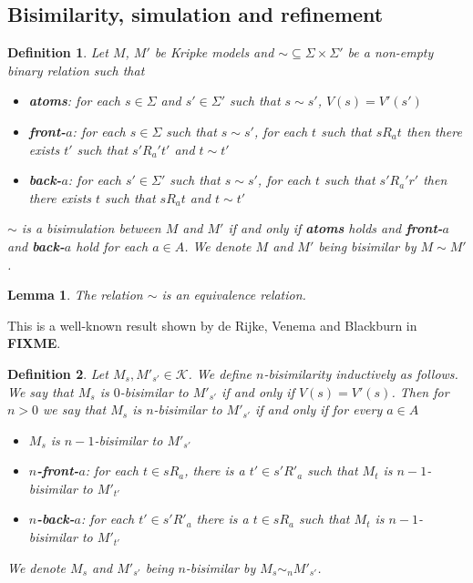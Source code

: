 \documentclass[12pt, a4paper, titlepage]{article}
\newtheorem{defn}{Definition}[subsection]
\newtheorem{lemma}{Lemma}[subsection]
\numberwithin{equation}{section}
\newcommand{\kripkeClass}{\mathcal{K}}
\newcommand{\FIXME}{{\bf FIXME}}
\begin{document}
\subsection{Bisimilarity, simulation and refinement}

\begin{defn} \label{bisimKripke}
	Let $M$, $M'$ be Kripke models and $\sim \subseteq \Sigma \times \Sigma'$ be a non-empty binary
	relation such that
	\begin{itemize}
		\item {\bf atoms}: for each $s \in \Sigma$ and $s' \in \Sigma'$ such that $s \sim s'$, $V(s) = V'(s')$
		\item {\bf front-$a$}: for each $s \in \Sigma$ such that $s \sim s'$, for each $t$ such that
		$s R_a t$ then there exists $t'$ such that $s' R_a' t'$ and $t \sim t'$
		\item {\bf back-$a$}: for each $s' \in \Sigma'$ such that $s \sim s'$, for each $t$ such that
		$s' R_a' r'$ then there exists $t$ such that $s R_a t$ and $t \sim t'$
	\end{itemize}
	$\sim$ is a bisimulation between $M$ and $M'$ if and only if {\bf atoms} holds and {\bf front-$a$}
	and {\bf back-$a$} hold for each $a \in A$.
	We denote $M$ and $M'$ being bisimilar by $M \sim M'$.
\end{defn}

\begin{lemma} \label{bisimEquivalence}
	The relation $\sim$ is an equivalence relation.
\end{lemma}

This is a well-known result shown by de Rijke, Venema and Blackburn in \FIXME.

\begin{defn} \label{nBisimKripke}
Let $M_s, M'_{s'} \in \kripkeClass$.
We define $n$-bisimilarity inductively as follows.
We say that $M_s$ is $0$-bisimilar to $M'_{s'}$ if and only if $V(s) = V'(s)$.
Then for $n > 0$ we say that $M_s$ is $n$-bisimilar to $M'_{s'}$ if and only if for every $a \in A$
\begin{itemize}
	\item $M_s$ is $n-1$-bisimilar to $M'_{s'}$
	\item {\bf $n$-front-$a$}: for each $t \in s R_a$, there is a $t' \in s' R'_a$ such that $M_t$ is
	$n-1$-bisimilar to $M'_{t'}$
	\item {\bf $n$-back-$a$}: for each $t' \in s' R'_a$ there is a $t \in s R_a$ such that $M_t$ is
	$n-1$-bisimilar to $M'_{t'}$
\end{itemize}
We denote $M_s$ and $M'_{s'}$ being $n$-bisimilar by $M_s \sim_n M'_{s'}$.
\end{defn}
\end{document}
